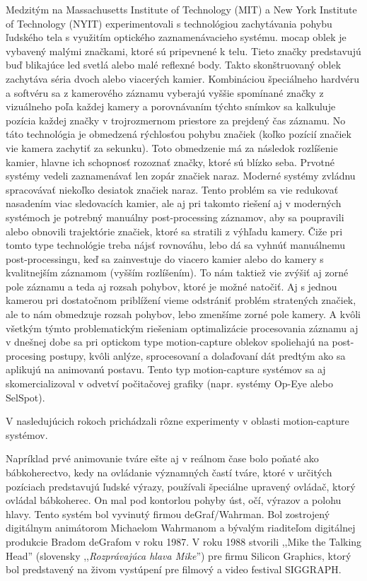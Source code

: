 Medzitým na Massachusetts Institute of Technology (MIT) a New York Institute of Technology (NYIT) experimentovali s technológiou zachytávania pohybu ľudského tela s využitím optického zaznamenávacieho systému. \acrlong{mocap} oblek je vybavený malými značkami, ktoré sú pripevnené k telu. Tieto značky predstavujú buď blikajúce \acrshort{led} svetlá alebo malé reflexné body. Takto skonštruovaný oblek zachytáva séria dvoch alebo viacerých kamier. Kombináciou špeciálneho hardvéru a softvéru sa z kamerového záznamu vyberajú vyššie spomínané značky z vizuálneho poľa každej kamery a porovnávaním týchto snímkov sa kalkuluje pozícia každej značky v trojrozmernom priestore za prejdený čas záznamu.
No táto technológia je obmedzená rýchlosťou pohybu značiek (koľko pozícií značiek vie kamera zachytiť za sekunku). Toto obmedzenie má za následok rozlíšenie kamier, hlavne ich schopnosť rozoznať značky, ktoré sú blízko seba. Prvotné systémy vedeli zaznamenávať len zopár značiek naraz. Moderné systémy zvládnu spracovávať niekoľko desiatok značiek naraz. Tento problém sa vie redukovať nasadením viac sledovacích kamier, ale aj pri takomto riešení aj v moderných systémoch je potrebný manuálny post-processing záznamov, aby sa poupravili alebo obnovili trajektórie značiek, ktoré sa stratili z výhľadu kamery. Čiže pri tomto type technológie treba nájsť rovnováhu, lebo dá sa vyhnúť manuálnemu post-processingu, keď sa zainvestuje do viacero kamier alebo do kamery s kvalitnejším záznamom (vyšším rozlíšením). To nám taktiež vie zvýšiť aj zorné pole záznamu a teda aj rozsah pohybov, ktoré je možné natočiť. Aj s jednou kamerou pri dostatočnom priblížení vieme odstrániť problém stratených značiek, ale to nám obmedzuje rozsah pohybov, lebo zmenšíme zorné pole kamery. A kvôli všetkým týmto problematickým riešeniam optimalizácie procesovania záznamu aj v dnešnej dobe sa pri optickom type motion-capture oblekov spoliehajú na post-procesing postupy, kvôli anlýze, sprocesovaní a dolaďovaní dát predtým ako sa aplikujú na animovanú postavu.
Tento typ motion-capture systémov sa aj skomercializoval v odvetví počitačovej grafiky (napr. systémy Op-Eye alebo SelSpot).

V nasledujúcich rokoch prichádzali rôzne experimenty v oblasti motion-capture systémov. 

Napríklad prvé animovanie tváre ešte aj v reálnom čase bolo poňaté ako bábkoherectvo, kedy na ovládanie významných častí tváre, ktoré v určitých pozíciach predstavujú ľudské výrazy, používali špeciálne upravený ovládač, ktorý ovládal bábkoherec. On mal pod kontorlou pohyby úst, očí, výrazov a polohu hlavy. Tento systém bol vyvinutý firmou deGraf/Wahrman. Bol zostrojený digitálnym animátorom Michaelom Wahrmanom a bývalým riaditeľom digitálnej produkcie Bradom deGrafom v roku 1987. V roku 1988 stvorili ,,Mike the Talking Head'' (slovensky ,,\textit{Rozprávajúca hlava Mike}'') pre firmu Silicon Graphics, ktorý bol predstavený na živom vystúpení pre filmový a video festival SIGGRAPH.

